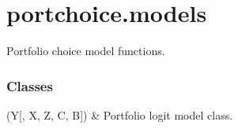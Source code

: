 \documentclass[a4paper,10pt,english]{sphinxhowto}
\begin{document}
\sphinxstepscope


\section{portchoice.models}
\label{\detokenize{generated/portchoice.models:module-portchoice.models}}\label{\detokenize{generated/portchoice.models:portchoice-models}}\label{\detokenize{generated/portchoice.models::doc}}
\sphinxAtStartPar
Portfolio choice model functions.
\subsubsection*{Classes}


\begin{savenotes}\sphinxattablestart
\sphinxthistablewithglobalstyle
\sphinxthistablewithnovlinesstyle
\centering
\begin{tabulary}{\linewidth}[t]{}
\sphinxtoprule
\sphinxtableatstartofbodyhook
\sphinxAtStartPar
{\hyperref[\detokenize{generated/portchoice.models:portchoice.models.PortLogit}]{}}(Y{[}, X, Z, C, B{]})
&
\sphinxAtStartPar
Portfolio logit model class.
\\
\sphinxbottomrule
\end{tabulary}
\sphinxtableafterendhook\par
\sphinxattableend\end{savenotes}
\end{document}
